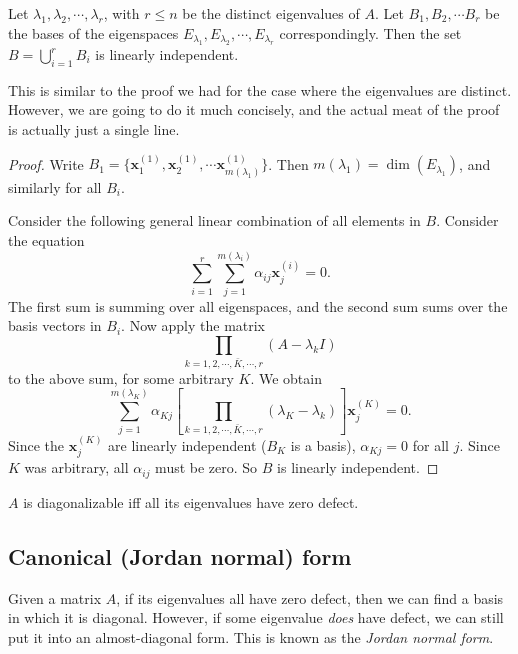 \documentclass[a4paper]{article}
\begin{document}
\begin{thm}
  Let $\lambda_1, \lambda_2, \cdots, \lambda_r$, with $r \leq n$ be the distinct eigenvalues of $A$. Let $B_1, B_2, \cdots B_r$ be the bases of the eigenspaces $E_{\lambda_1}, E_{\lambda_2}, \cdots, E_{\lambda_r}$ correspondingly. Then the set $\displaystyle B = \bigcup_{i= 1}^r B_i$ is linearly independent.
\end{thm}

This is similar to the proof we had for the case where the eigenvalues are distinct. However, we are going to do it much concisely, and the actual meat of the proof is actually just a single line.
\begin{proof}
  Write $B_1 = \{\mathbf{x}_1^{(1)}, \mathbf{x}_2^{(1)}, \cdots \mathbf{x}_{m(\lambda_1)}^{(1)}\}$. Then $m(\lambda_1) = \dim (E_{\lambda_1})$, and similarly for all $B_i$.

  Consider the following general linear combination of all elements in $B$. Consider the equation
  \[
    \sum_{i = 1}^r\sum_{j = 1}^{m(\lambda_i)} \alpha_{ij} \mathbf{x}_j^{(i)} = 0.
  \]
  The first sum is summing over all eigenspaces, and the second sum sums over the basis vectors in $B_i$. Now apply the matrix
  \[
    \prod_{k = 1, 2, \cdots, \bar{K}, \cdots, r} (A - \lambda_kI)
  \]
  to the above sum, for some arbitrary $K$. We obtain
  \[
    \sum_{j = 1}^{m(\lambda_K)}\alpha_{Kj}\left[\prod_{k = 1, 2, \cdots, \bar{K}, \cdots, r}(\lambda_K - \lambda_k)\right]\mathbf{x}_j^{(K)} = 0.
  \]
  Since the $\mathbf{x}^{(K)}_j$ are linearly independent ($B_K$ is a basis), $\alpha_{Kj} = 0$ for all $j$. Since $K$ was arbitrary, all $\alpha_{ij}$ must be zero. So $B$ is linearly independent.
\end{proof}

\begin{prop}
  $A$ is diagonalizable iff all its eigenvalues have zero defect.
\end{prop}
\subsection{Canonical (Jordan normal) form}
Given a matrix $A$, if its eigenvalues all have zero defect, then we can find a basis in which it is diagonal. However, if some eigenvalue \emph{does} have defect, we can still put it into an almost-diagonal form. This is known as the \emph{Jordan normal form}.
\end{document}

